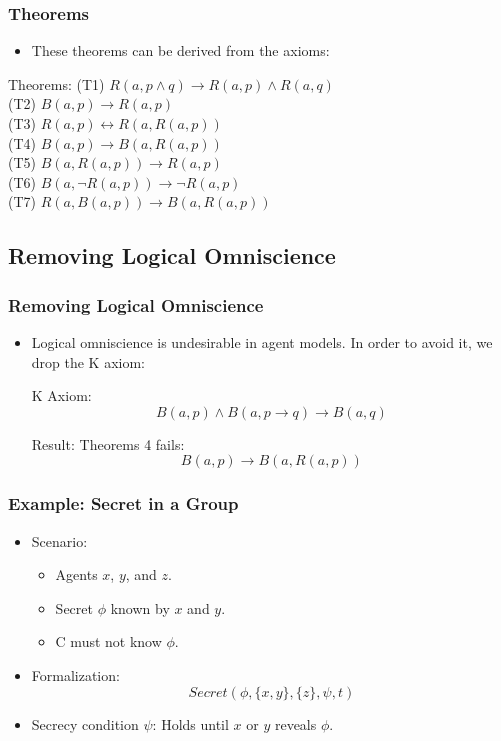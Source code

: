 \documentclass[aspectratio=169]{beamer}
\begin{document}
\begin{frame}
\frametitle{Theorems}
\begin{itemize}
    \item These theorems can be derived from the axioms:
\end{itemize}
\begin{block}{Theorems:}
    \Large
    \normalfont
    (T1) $R(a, p \wedge q) \rightarrow R(a, p) \wedge R(a, q)$ \\
    (T2) $B(a, p) \rightarrow R(a, p)$ \\
    (T3) $R(a, p) \leftrightarrow R(a, R(a, p))$ \\
    (T4) $B(a, p) \rightarrow B(a, R(a, p))$ \\
    (T5) $B(a, R(a, p)) \rightarrow R(a, p)$ \\
    (T6) $B(a, \neg R(a, p)) \rightarrow \neg R(a, p)$ \\
    (T7) $R(a, B(a, p)) \rightarrow B(a, R(a, p))$
\end{block}
\end{frame}

\subsection{Removing Logical Omniscience}
\begin{frame}
\frametitle{Removing Logical Omniscience}
\Large 
\begin{itemize}
    \item Logical omniscience is undesirable in agent models. In order to avoid it, we drop the K axiom:
    \begin{block}{K Axiom:}
    \[
    B(a, p) \wedge B(a, p \rightarrow q) \rightarrow B(a, q)
    \]
    \end{block}
    \begin{block}{Result:}
        Theorems 4 fails: 
        \[
        B(a, p) \rightarrow B(a, R(a, p))
        \]
    \end{block}
\end{itemize}
\end{frame}


\begin{frame}
\frametitle{Example: Secret in a Group}
\begin{itemize}
    \Large
    \item Scenario:
    \begin{itemize}
        \Large
        \item Agents $x$, $y$, and $z$.
        \item Secret $\phi$ known by $x$ and $y$.
        \item C must not know $\phi$.
    \end{itemize}
    \item Formalization:
    \[
    Secret(\phi, \{x,y\}, \{z\}, \psi, t)
    \]
    \item Secrecy condition $\psi$: Holds until $x$ or $y$ reveals $\phi$.
\end{itemize}
\end{frame}
\end{document}
